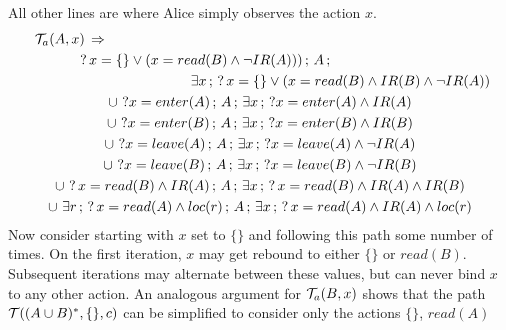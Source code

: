 All other lines are where Alice simply observes the action $x$. \begin{gather*}
\mathcal{T}_{a}(A,x)\,\Rightarrow\,\,\,\,\,\,\,\,\,\,\,\,\,\,\,\,\,\,\,\,\,\,\,\,\,\,\,\,\,\,\,\,\,\,\,\,\,\,\,\,\,\,\,\,\,\,\,\,\,\,\,\,\,\,\,\,\,\,\,\,\,\,\,\,\,\,\,\,\,\,\,\,\,\,\,\,\,\,\,\,\,\,\,\,\,\,\,\,\,\,\,\,\,\,\,\,\,\,\,\,\,\,\,\,\,\,\,\,\,\,\,\,\,\,\,\,\,\,\,\,\,\,\,\,\,\,\,\,\,\,\,\,\,\,\,\,\,\,\,\,\,\,\,\,\,\,\,\,\,\,\,\,\,\,\,\,\,\,\,\,\,\,\,\\
?\, x=\{\}\vee(x=read(B)\wedge\neg IR(A)))\,;\, A\,;\,\,\,\,\,\,\,\,\,\,\,\,\,\,\,\,\,\,\,\,\,\,\,\,\,\,\,\,\,\,\,\,\,\,\,\,\,\,\,\,\,\,\,\,\,\,\,\\
\,\,\,\,\,\,\,\,\,\,\,\,\,\,\,\,\,\,\,\,\,\,\,\,\,\,\,\,\,\,\,\,\,\,\,\,\,\,\,\,\,\,\,\,\,\,\,\,\,\,\,\,\,\,\,\,\,\,\,\,\,\,\,\,\,\,\,\,\,\exists x\,;\,?\, x=\{\}\vee(x=read(B)\wedge IR(B)\wedge\neg IR(A))\\
\cup\,\,?x=enter(A)\,;\, A\,;\,\exists x\,;\,?x=enter(A)\wedge IR(A)\\
\cup\,\,?x=enter(B)\,;\, A\,;\,\exists x\,;\,?x=enter(B)\wedge IR(B)\\
\cup\,\,?x=leave(A)\,;\, A\,;\,\exists x\,;\,?x=leave(A)\wedge\neg IR(A)\\
\cup\,\,?x=leave(B)\,;\, A\,;\,\exists x\,;\,?x=leave(B)\wedge\neg IR(B)\\
\cup\,\,?\, x=read(B)\wedge IR(A)\,;\, A\,;\,\exists x\,;\,?\, x=read(B)\wedge IR(A)\wedge IR(B)\\
\cup\,\,\exists r\,;\,?\, x=read(A)\wedge loc(r)\,;\, A\,;\,\exists x\,;\,?\, x=read(A)\wedge IR(A)\wedge loc(r)\end{gather*}
 Now consider starting with $x$ set to $\{\}$ and following this
path some number of times. On the first iteration, $x$ may get rebound
to either $\{\}$ or $read(B)$. Subsequent iterations may alternate
between these values, but can never bind $x$ to any other action.
An analogous argument for $\mathcal{T}_{a}(B,x)$ shows that the path $\mathcal{T}((A\cup B)^{*},\{\},c)$
can be simplified to consider only the actions $\{\}$, $read(A)$

